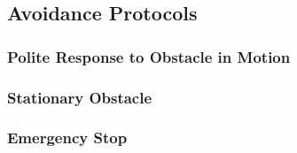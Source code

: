 \subsection{Avoidance Protocols}




\subsubsection{Polite Response to Obstacle in Motion}

\subsubsection{Stationary Obstacle}

\subsubsection{Emergency Stop}